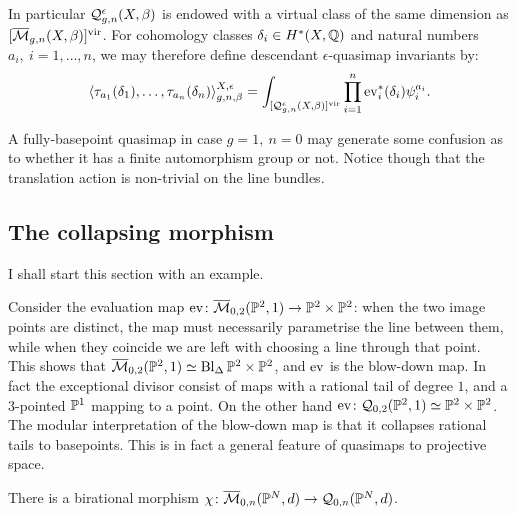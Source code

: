 In particular $\mathcal{Q}^{\epsilon}_{g,n}(X,\beta)$ is endowed with a virtual class of the same dimension as $[\overline{\mathcal{M}}_{g,n}(X,\beta)]^{\mathrm{vir}}$. For cohomology classes $\delta_i\in H^*(X,\mathbb{Q})$ and natural numbers $a_i,\ i=1,\ldots,n$, we may therefore define descendant $\epsilon$-quasimap invariants by:
\[\langle \tau_{a_1}(\delta_1),\ldots,\tau_{a_n}(\delta_n)\rangle^{X,\epsilon}_{g,n,\beta}=\int_{[\mathcal{Q}^{\epsilon}_{g,n}(X,\beta)]^{\mathrm{vir}}}\prod_{i=1}^n \operatorname{ev}_i^*(\delta_i)\psi_i^{a_i}.\]

\begin{rmk}
 A fully-basepoint quasimap in case $g=1,\ n=0$ may generate some confusion as to whether it has a finite automorphism group or not. Notice though that the translation action is non-trivial on the line bundles.
\end{rmk}

\subsection{The collapsing morphism}\label{sec:collapsing} I shall start this section with an example.
\begin{ex}\label{ex:lines_in_p2}
 Consider the evaluation map $\operatorname{ev}\colon \overline{\mathcal{M}}_{0,2}(\mathbb P^2,1)\rightarrow \mathbb P^2\times\mathbb P^2$: when the two image points are distinct, the map must necessarily parametrise the line between them, while when they coincide we are left with choosing a line through that point. This shows that $\overline{\mathcal{M}}_{0,2}(\mathbb P^2,1)\simeq \operatorname{Bl}_{\Delta}\mathbb P^2\times\mathbb P^2$, and $\operatorname{ev}$ is the blow-down map. In fact the exceptional divisor consist of maps with a rational tail of degree $1$, and a $3$-pointed $\mathbb P^1$ mapping to a point. On the other hand $\operatorname{ev}\colon \mathcal{Q}_{0,2}(\mathbb P^2,1)\simeq \mathbb P^2\times\mathbb P^2$. The modular interpretation of the blow-down map is that it collapses rational tails to basepoints. This is in fact a general feature of quasimaps to projective space.
\end{ex}

\begin{lem}
 There is a birational  morphism $\chi\colon \overline{\mathcal{M}}_{0,n}(\mathbb P^N,d)\rightarrow \mathcal{Q}_{0,n}(\mathbb P^N,d)$.
\end{lem}

